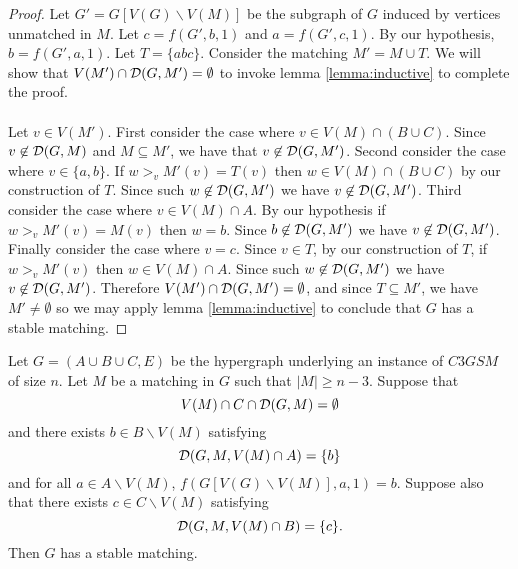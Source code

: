 \begin{proof}
Let $G' = G[V(G)\backslash V(M)]$ be the subgraph of $G$ induced by vertices unmatched in $M$. Let $c = f(G',b,1)$ and $a = f(G',c,1)$. By our hypothesis, $b = f(G',a,1)$. Let $T = \{abc\}$. Consider the matching $M' = M \cup T$. We will show that $V(M') \cap \mathcal{D}(G, M') = \emptyset$ to invoke lemma \ref{lemma:inductive} to complete the proof.
\paragraph{}
Let $v \in V(M')$. First consider the case where $v \in V(M) \cap ( B \cup C)$. Since $v \not\in \mathcal{D}(G,M)$ and $M \subseteq M'$, we have that $v \not\in \mathcal{D}(G,M')$. Second consider the case where $v \in \{a,b\}$. If $w >_v M'(v)=T(v)$ then $w \in V(M) \cap (B \cup C)$ by our construction of $T$. Since such $ w\not\in \mathcal{D}(G,M')$ we have $v \not\in \mathcal{D}(G,M')$. Third consider the case where $v \in V(M) \cap A$. By our hypothesis if $w >_v M'(v) = M(v)$ then $w = b$. Since $b \not\in \mathcal{D}(G,M')$ we have $v \not\in \mathcal{D}(G,M')$. Finally consider the case where $v = c$. Since $v \in T$, by our construction of $T$, if $w >_v M'(v)$ then $w \in V(M) \cap A$. Since such $w \not\in \mathcal{D}(G,M')$ we have $v \not\in \mathcal{D}(G,M')$. Therefore $V(M') \cap \mathcal{D}(G,M') = \emptyset$, and since $T \subseteq M'$,  we have $M' \neq \emptyset$ so we may apply lemma \ref{lemma:inductive} to conclude that $G$ has a stable matching.
\end{proof}
\begin{lemma}
Let $G=(A\cup B \cup C, E)$ be the hypergraph underlying an instance of $C3GSM$ of size $n$. Let $M$ be a matching in $G$ such that $|M| \geq n-3$. Suppose that 
$$V(M) \cap C \cap \mathcal{D}(G,M) = \emptyset$$
and there exists $b \in B \backslash V(M)$ satisfying
$$\mathcal{D}(G,M,V(M) \cap A) = \{b\}$$
and for all $a \in A \backslash V(M)$, $f(G[V(G)\backslash V(M)], a, 1) = b$. Suppose also that there exists $c \in C \backslash V(M)$ satisfying
$$\mathcal{D}(G,M,V(M) \cap B ) = \{c\}.$$ 
Then $G$ has a stable matching.
\end{lemma}
